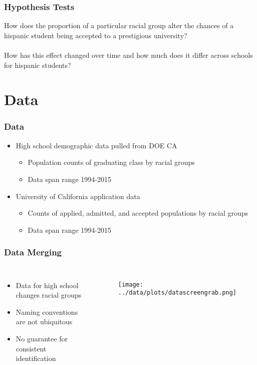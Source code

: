 \documentclass{beamer}
\begin{document}

\begin{frame}
\frametitle{Hypothesis Tests}
How does the proportion of a particular racial group alter the chances of a
hispanic student being accepted to a prestigious university?  \\
~ \\
How has this effect changed over time and how much does it differ across
schools for hispanic students?
\end{frame}

\section{Data}

\begin{frame}
\frametitle{Data}
\begin{itemize}
  \item High school demographic data pulled from DOE CA
  \begin{itemize}
    \item Population counts of graduating class by racial groups
    \item Data span range 1994-2015
  \end{itemize}
  \item University of California application data
  \begin{itemize}
    \item Counts of applied, admitted, and accepted populations by racial groups
    \item Data span range 1994-2015
  \end{itemize}
\end{itemize}
\end{frame}


\begin{frame}
\frametitle{Data Merging}
\begin{columns}[c] %

\begin{itemize}
\item Data for high school changes racial groups
\item Naming conventions are not ubiquitous
\item No guarantee for consistent identification
\end{itemize}

\begin{figure}
\texttt{[image: ../data/plots/datascreengrab.png]}
\end{figure}
\end{columns}
\end{frame}
\end{document}
